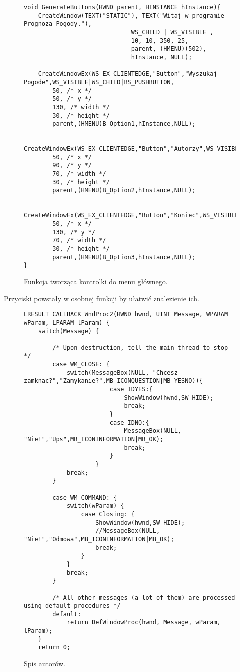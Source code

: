 \documentclass[a4paper,twoside,12pt]{mgr}
\begin{document}
\begin{figure}[H]
\centering
\begin{lstlisting}[frame=single]	
void GenerateButtons(HWND parent, HINSTANCE hInstance){
	CreateWindow(TEXT("STATIC"), TEXT("Witaj w programie Prognoza Pogody."),
                              WS_CHILD | WS_VISIBLE ,
                              10, 10, 350, 25,
                              parent, (HMENU)(502),
                              hInstance, NULL);
		
	CreateWindowEx(WS_EX_CLIENTEDGE,"Button","Wyszukaj Pogode",WS_VISIBLE|WS_CHILD|BS_PUSHBUTTON,
		50, /* x */
		50, /* y */
		130, /* width */
		30, /* height */
		parent,(HMENU)B_Option1,hInstance,NULL);
	
	CreateWindowEx(WS_EX_CLIENTEDGE,"Button","Autorzy",WS_VISIBLE|WS_CHILD|BS_PUSHBUTTON,
		50, /* x */
		90, /* y */
		70, /* width */
		30, /* height */
		parent,(HMENU)B_Option2,hInstance,NULL);
		
	CreateWindowEx(WS_EX_CLIENTEDGE,"Button","Koniec",WS_VISIBLE|WS_CHILD|BS_PUSHBUTTON,
		50, /* x */
		130, /* y */
		70, /* width */
		30, /* height */
		parent,(HMENU)B_Option3,hInstance,NULL);
}
\end{lstlisting}
\caption{Funkcja tworząca kontrolki do menu głównego.}%
\label{rys:etykieta}
\end{figure}
Przyciski powstały w osobnej funkcji by ułatwić znalezienie ich.
\begin{figure}[H]
\centering
\begin{lstlisting}[frame=single]	
LRESULT CALLBACK WndProc2(HWND hwnd, UINT Message, WPARAM wParam, LPARAM lParam) {
	switch(Message) {
		
		/* Upon destruction, tell the main thread to stop */
		case WM_CLOSE: {
			switch(MessageBox(NULL, "Chcesz zamknac?","Zamykanie?",MB_ICONQUESTION|MB_YESNO)){
						case IDYES:{
							ShowWindow(hwnd,SW_HIDE);
							break;
						}
						case IDNO:{
							MessageBox(NULL, "Nie!","Ups",MB_ICONINFORMATION|MB_OK);
							break;
						}
					}
			break;
		}
		
		case WM_COMMAND: {
			switch(wParam) {
				case Closing: {
					ShowWindow(hwnd,SW_HIDE);
					//MessageBox(NULL, "Nie!","Odmowa",MB_ICONINFORMATION|MB_OK);
					break;
				}
			}
			break;
		}
		
		/* All other messages (a lot of them) are processed using default procedures */
		default:
			return DefWindowProc(hwnd, Message, wParam, lParam);
	}
	return 0;
\end{lstlisting}
\caption{Spis autorów.}%
\label{rys:etykieta}
\end{figure}
\end{document}
